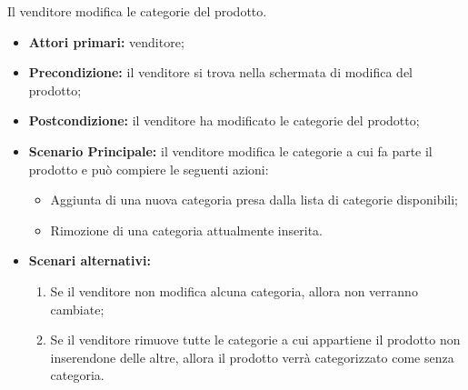 Il venditore modifica le categorie del prodotto.
\begin{itemize}
    \item \textbf{Attori primari:} venditore;
    \item \textbf{Precondizione:} il venditore si trova nella schermata di modifica del prodotto;
    \item \textbf{Postcondizione:} il venditore ha modificato le categorie del prodotto;
    \item \textbf{Scenario Principale:} il venditore modifica le categorie a cui fa parte il prodotto e può compiere le seguenti azioni:
    \begin{itemize}
        \item Aggiunta di una nuova categoria presa dalla lista di categorie disponibili;
        \item Rimozione di una categoria attualmente inserita.
    \end{itemize}
	\item \textbf{Scenari alternativi:}
    \begin{enumerate}[label=\lett]
		\item Se il venditore non modifica alcuna categoria, allora non verranno cambiate;
		\item Se il venditore rimuove tutte le categorie a cui appartiene il prodotto non inserendone delle altre, allora il prodotto verrà categorizzato come senza categoria.
	\end{enumerate}
\end{itemize}

\label{modifica-prodotto.prezzo}

